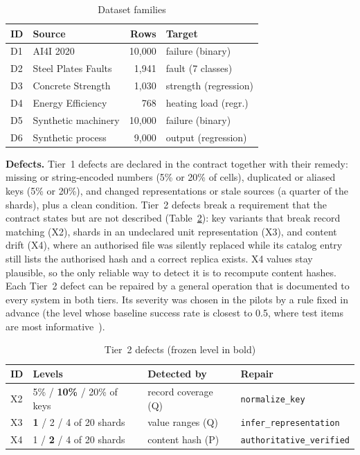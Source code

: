 \documentclass[conference]{IEEEtran}
\begin{document}
\begin{table}[t]
\caption{Dataset families}
\label{tab:data}
\centering\footnotesize\setlength{\tabcolsep}{4pt}
\begin{tabular}{@{}llrl@{}}
\toprule
ID & Source & Rows & Target \\
\midrule
D1 & AI4I 2020~\cite{uci601ai4i} & 10,000 & failure (binary) \\
D2 & Steel Plates Faults~\cite{uci198steel} & 1,941 & fault (7 classes) \\
D3 & Concrete Strength~\cite{uci165concrete,yeh1998concrete} & 1,030 & strength (regression) \\
D4 & Energy Efficiency~\cite{uci242energy} & 768 & heating load (regr.) \\
D5 & Synthetic machinery & 10,000 & failure (binary) \\
D6 & Synthetic process & 9,000 & output (regression) \\
\bottomrule
\end{tabular}
\end{table}

\textbf{Defects.} Tier~1 defects are declared in the contract together with their remedy: missing or string-encoded
numbers (5\% or 20\% of cells), duplicated or aliased keys (5\% or 20\%), and changed representations or stale
sources (a quarter of the shards), plus a clean condition. Tier~2 defects break a requirement that the contract states
but are not described (Table~\ref{tab:tier2}): key variants that break record matching (X2), shards in an undeclared
unit representation (X3), and content drift (X4), where an authorised file was silently replaced while its catalog
entry still lists the authorised hash and a correct replica exists. X4 values stay plausible, so the only reliable
way to detect it is to recompute content hashes. Each Tier~2 defect can be repaired by a general operation that is
documented to every system in both tiers. Its severity was chosen in the pilots by a rule fixed in advance (the level
whose baseline success rate is closest to 0.5, where test items are most informative~\cite{wang2026dbe}).

\begin{table}[t]
\caption{Tier~2 defects (frozen level in bold)}
\label{tab:tier2}
\centering\footnotesize\setlength{\tabcolsep}{3pt}
\begin{tabular}{@{}lp{}p{}l@{}}
\toprule
ID & Levels & Detected by & Repair \\
\midrule
X2 & 5\% / \textbf{10\%} / 20\% of keys & record coverage (Q) & \texttt{\scriptsize normalize\_key} \\
X3 & \textbf{1} / 2 / 4 of 20 shards & value ranges (Q) & \texttt{\scriptsize infer\_representation} \\
X4 & 1 / \textbf{2} / 4 of 20 shards & content hash (P) & \texttt{\scriptsize authoritative\_verified} \\
\bottomrule
\end{tabular}
\end{table}
\end{document}
